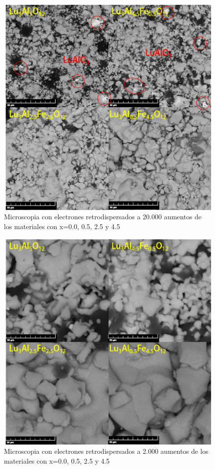 \begin{appendix}
	\begin{figure}[h]
		\centering%

		\includegraphics[width=\textwidth]{Kap5/ret20k.png}%
		\caption{Microscopia con electrones retrodispersados a 20.000 aumentos de los
		materiales  con x=0.0, 0.5, 2.5 y
		4.5}\label{fig:ret20}
	\end{figure}

	\begin{figure}[h]
		\centering%

		\includegraphics[width=\textwidth]{Kap5/ret90k.png}%
		\caption{Microscopia con electrones retrodispersados a 2.000 aumentos de los
		materiales  con x=0.0, 0.5, 2.5 y
		4.5}\label{fig:ret90}
	\end{figure}


\end{appendix}

